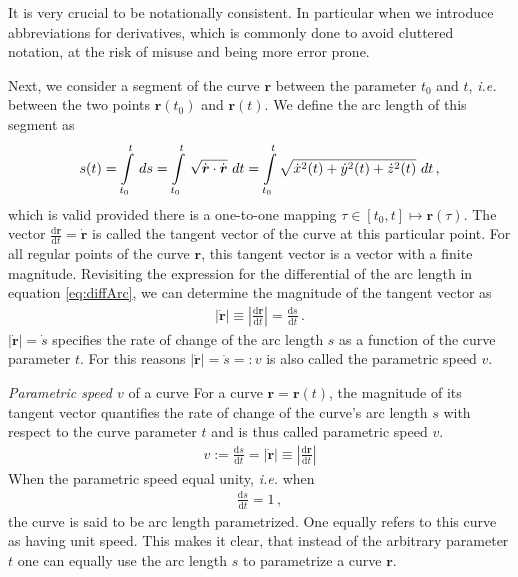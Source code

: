 \documentclass[11pt, DINA4, fleqn]{amsart}
\def\df{\mathrm{d}\xspace}
\newcommand{\dd}[2]{\frac{\df#1}{\df#2}}
\def\vr{\boldsymbol{r}\xspace}
\def\vrd{\dot{\vr}\xspace}
\begin{document}
It is very crucial to be notationally consistent.
In particular when we introduce abbreviations for derivatives, which is commonly done to avoid cluttered notation, at the risk of misuse and being more error prone.

Next, we consider a segment of the curve $\vr$ between the parameter $t_0$ and $t$, \textit{i.e.} between the two points $\vr(t_0)$ and $\vr(t)$.
We define the arc length of this segment as
\begin{align}
s(t) = \int\displaylimits_{t_0}^{t} \, ds = \int\displaylimits_{t_0}^{t} \,
\sqrt{\vrd \cdot \vrd} \,\, dt
= \int\displaylimits_{t_0}^{t}\sqrt{\dot{x}^2(t) + \dot{y}^2(t) + \dot{z}^2(t)} \,\, dt \, ,
\label{eq:arcLength}
\end{align}
which is valid provided there is a one-to-one mapping $\tau \in[t_0,t] \longmapsto \vr(\tau)$.
The vector $\dd{\vr}{t} = \vrd$ is called the tangent vector of the curve at this particular point. For all regular points of the curve $\vr$, this tangent vector is a vector with a finite magnitude. Revisiting the expression for the differential of the arc length in equation \eqref{eq:diffArc}, we can determine the magnitude of the tangent vector as
\begin{align}
\left|\vrd\right| \equiv \left|\dd{\vr}{t}\right| = \dd{s}{t} \, .
\end{align}
$|\vrd| = \dot{s}$ specifies the rate of change of the arc length $s$ as a function of the curve parameter $t$. For this reasons $|\vrd| = \dot{s} =:v$ is also called the parametric speed $v$.

\begin{mybox_tc3}{\emph{Parametric speed $v$} of a curve}
For a curve $\vr = \vr(t)$, the magnitude of its tangent vector 
quantifies the rate of change of the curve's arc length $s$ with respect to the curve parameter $t$ and is thus called parametric speed $v$.
\begin{align}
v := \dd{s}{t} = \left|\vrd\right| \equiv \left|\dd{\vr}{t}\right|
\label{eq:parametricSpeed}
\end{align}
When the parametric speed equal unity, \textit{i.e.} when
\begin{align}
\dd{s}{t} = 1 \, ,
\end{align}
the curve is said to be arc length parametrized. One equally refers to this curve as having unit speed.
This makes it clear, that instead of the arbitrary parameter $t$ one can equally use the arc length $s$ to parametrize a curve $\vr$.
\end{mybox_tc3}
\end{document}
